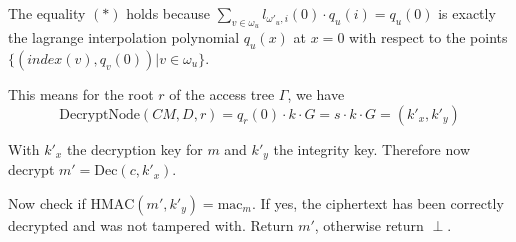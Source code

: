 The equality $(*)$ holds because $\sum_{v \in \omega_u} l_{\omega'_u, i}(0) \cdot q_u(i) = q_u(0)$ is exactly the lagrange interpolation polynomial $q_u(x)$ at $x = 0$ with respect to the points $\{(index(v), q_v(0)) | v \in \omega_u\}$. 

This means for the root $r$ of the access tree $\Gamma$, we have
\begin{equation*}
    \text{DecryptNode}(CM, D, r) =  q_r(0) \cdot k \cdot G = s \cdot k \cdot G = (k'_x, k'_y)
\end{equation*}

With $k'_x$ the decryption key for $m$ and $k'_y$ the integrity key. Therefore now decrypt $m' = \text{Dec}(c, k'_x)$.

Now check if $\text{HMAC}(m', k'_y) = \text{mac}_m$. If yes, the ciphertext has been correctly decrypted and was not tampered with. Return $m'$, otherwise return $\perp$.